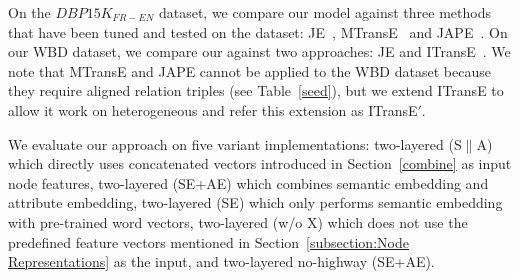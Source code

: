 

    On the $DBP15K_{FR-EN}$ dataset, we compare our \HRGCN model against three methods that have been tuned and tested on the dataset:
    JE~\cite{hao2016joint}, MTransE~\cite{chen2016multilingual} and JAPE~\cite{sun2017cross}. 	On our WBD dataset, we compare our \HRGCN
    against two approaches: JE and ITransE~\cite{zhu2017iterative}. We note that MTransE and JAPE cannot be applied to the WBD dataset because they
    require aligned relation triples (see Table~\ref{seed}), but we extend ITransE to allow it work on heterogeneous
    \KGs and refer this extension as ITransE$'$.
%


	
	 We evaluate our approach on five variant implementations: two-layered \HRGCN (S$\|$A) which directly uses concatenated vectors introduced in Section~\ref{combine} as input node features, two-layered \HRGCN (SE+AE) which combines semantic embedding and attribute embedding, two-layered \HRGCN (SE) which only performs semantic embedding with pre-trained word vectors, two-layered \HRGCN (w/o X) which does not use the predefined feature vectors mentioned in Section~\ref{subsection:Node
		Representations} as the input, and two-layered no-highway \RGCN (SE+AE). %
	


